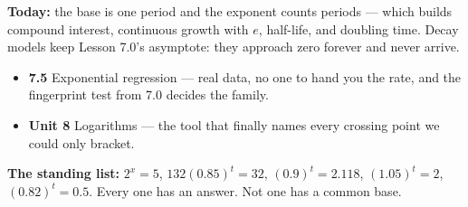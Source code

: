 \documentclass[aspectratio=169, 11pt]{beamer}
\begin{document}
\begin{frame}[t, plain]
  \textbf{Today:} the base is one period and the exponent counts periods --- which builds compound
  interest, continuous growth with $e$, half-life, and doubling time. Decay models keep Lesson 7.0's
  asymptote: they approach zero forever and never arrive.\\[8pt]
  \begin{itemize}\setlength{\itemsep}{3pt}
    \item \textbf{7.5} Exponential regression --- real data, no one to hand you the rate, and the
          fingerprint test from 7.0 decides the family.
    \item \textbf{Unit 8} Logarithms --- the tool that finally names every crossing point we could only
          bracket.
  \end{itemize}
  \vspace{6pt}
  \begin{center}
    \begin{minipage}{0.88\textwidth}
      {\footnotesize \textbf{The standing list:} $2^{x}=5$, \; $132(0.85)^{t}=32$, \;
      $(0.9)^{t}=2.118$, \; $(1.05)^{t}=2$, \; $(0.82)^{t}=0.5$. Every one has an answer. Not one has
      a common base.}
    \end{minipage}
  \end{center}
\end{frame}
\end{document}
